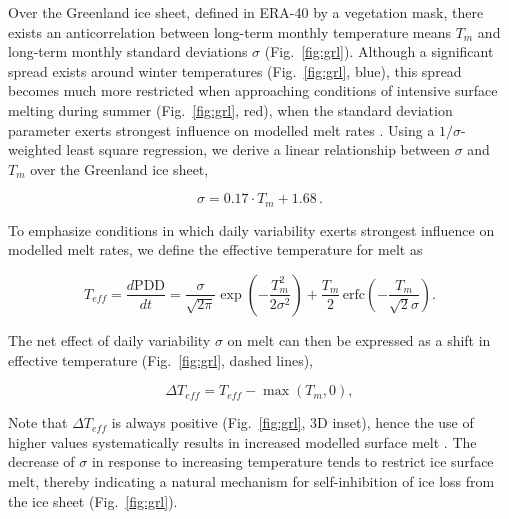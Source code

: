 \documentclass[review]{igs}
\begin{document}
Over the Greenland ice sheet, defined in ERA-40 by a vegetation mask, there exists an anticorrelation between long-term monthly temperature means $T_{m}$ and long-term monthly standard deviations $\sigma$ (Fig.~\ref{fig:grl}). Although a significant spread exists around winter temperatures (Fig.~\ref{fig:grl}, blue), this spread becomes much more restricted when approaching conditions of intensive surface melting during summer (Fig.~\ref{fig:grl}, red), when the standard deviation parameter exerts strongest influence on modelled melt rates \citep{rogozhina-rau-inpress}. Using a $1/\sigma$-weighted least square regression, we derive a linear relationship between $\sigma$ and $T_{m}$ over the Greenland ice sheet,

\begin{equation} \label{eq:sigma}
    \sigma = 0.17 \cdot T_{m} + 1.68\,.
\end{equation}

To emphasize conditions in which daily variability exerts strongest influence on modelled melt rates, we define the effective temperature for melt as

\begin{equation} \label{eq:teff}
    T_{eff} = \frac{d\mathrm{PDD}}{dt}
        = \frac{\sigma}{\sqrt{2\pi}} \exp\left({-\frac{T_{m}^2}{2\sigma^2}}\right)
            + \frac{T_{m}}{2} \, \mathrm{erfc} \left(-\frac{T_{m}}{\sqrt{2}\sigma}\right).
\end{equation}

The net effect of daily variability $\sigma$ on melt can then be expressed as a shift in effective temperature (Fig.~\ref{fig:grl}, dashed lines),

\begin{equation} \label{eq:dteff}
    \Delta T_{eff} = T_{eff} - \max(T_{m}, 0),
\end{equation}

Note that $\Delta T_{eff}$ is always positive (Fig.~\ref{fig:grl}, 3D inset), hence the use of higher values systematically results in increased modelled surface melt \citep{rogozhina-rau-inpress}. The decrease of $\sigma$ in response to increasing temperature tends to restrict ice surface melt, thereby indicating a natural mechanism for self-inhibition of ice loss from the ice sheet (Fig.~\ref{fig:grl}).
\end{document}
